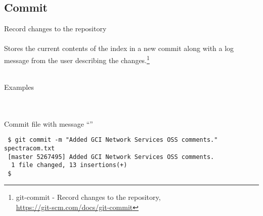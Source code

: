 
\newpage
\subsection{Commit}
Record changes to the repository
\\
\\
Stores the current contents of the index in a new commit along with
a log message from the user describing the changes.\footnote{git-commit - Record changes to the repository,\\
\href{https://git-scm.com/docs/git-commit}{https://git-scm.com/docs/git-commit}}
\\
\\

\noindent \begin{bf}Examples\end{bf}
\\
\\
\noindent Commit  file with message
``''
\begin{Verbatim}
 $ git commit -m "Added GCI Network Services OSS comments." spectracom.txt
 [master 5267495] Added GCI Network Services OSS comments.
  1 file changed, 13 insertions(+)
 $ 
\end{Verbatim}
